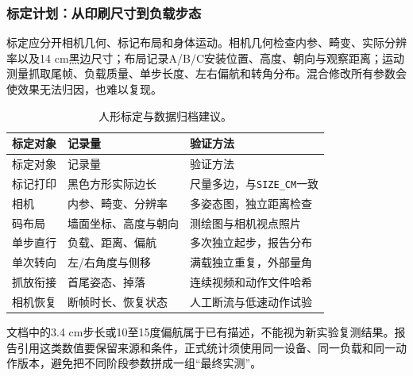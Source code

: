 \subsubsection{标定计划：从印刷尺寸到负载步态}
标定应分开相机几何、标记布局和身体运动。相机几何检查内参、畸变、实际分辨率以及14 cm黑边尺寸；布局记录A/B/C安装位置、高度、朝向与观察距离；运动测量抓取尾帧、负载质量、单步长度、左右偏航和转角分布。混合修改所有参数会使效果无法归因，也难以复现。
\begin{longtable}{p{28mm}p{45mm}p{59mm}}\caption{人形标定与数据归档建议。}\\\toprule 标定对象 & 记录量 & 验证方法\\\midrule\endfirsthead\toprule 标定对象 & 记录量 & 验证方法\\\midrule\endhead
标记打印 & 黑色方形实际边长 & 尺量多边，与\texttt{SIZE\_\allowbreak CM}一致\\
相机 & 内参、畸变、分辨率 & 多姿态图，独立距离检查\\
码布局 & 墙面坐标、高度与朝向 & 测绘图与相机视点照片\\
单步直行 & 负载、距离、偏航 & 多次独立起步，报告分布\\
单次转向 & 左/右角度与侧移 & 满载独立重复，外部量角\\
抓放衔接 & 首尾姿态、掉落 & 连续视频和动作文件哈希\\
相机恢复 & 断帧时长、恢复状态 & 人工断流与低速动作试验\\\bottomrule\end{longtable}
文档中的3.4 cm步长或10至15度偏航属于已有描述，不能视为新实验复测结果。报告引用这类数值要保留来源和条件，正式统计须使用同一设备、同一负载和同一动作版本，避免把不同阶段参数拼成一组“最终实测”。

